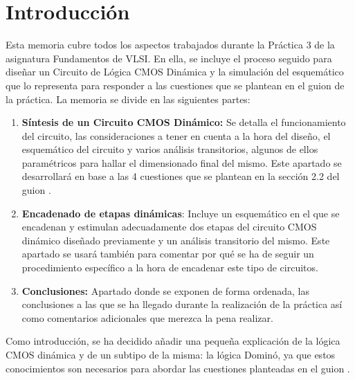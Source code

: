 
\renewcommand{\chaptername}{Sección}
\chapter{Introducción}

Esta memoria cubre todos los aspectos trabajados durante la Práctica 3 \cite{Guion} de la asignatura Fundamentos de VLSI. En ella, se incluye el proceso seguido para diseñar un Circuito de Lógica CMOS \cite{MOSFET} Dinámica y la simulación del esquemático que lo representa para responder a las cuestiones que se plantean en el guion de la práctica. La memoria se divide en las siguientes partes:

\begin{enumerate}
    \item \textbf{Síntesis de un Circuito CMOS Dinámico:} Se detalla el funcionamiento del circuito, las consideraciones a tener en cuenta a la hora del diseño, el esquemático del circuito y varios análisis transitorios, algunos de ellos paramétricos para hallar el dimensionado final del mismo. Este apartado se desarrollará en base a las 4 cuestiones que se plantean en la sección 2.2 del guion \cite{Guion}.
    \item \textbf{Encadenado de etapas dinámicas}: Incluye un esquemático en el que se encadenan y estimulan adecuadamente dos etapas del circuito CMOS dinámico diseñado previamente y un análisis transitorio del mismo. Este apartado se usará también para comentar por qué se ha de seguir un procedimiento específico a la hora de encadenar este tipo de circuitos.
    \item \textbf{Conclusiones:} Apartado donde se exponen de forma ordenada, las conclusiones a las que se ha llegado durante la realización de la práctica así como comentarios adicionales que merezca la pena realizar.
\end{enumerate}

Como introducción, se ha decidido añadir una pequeña explicación de la lógica CMOS dinámica y de un subtipo de la misma: la lógica Dominó, ya que estos conocimientos son necesarios para abordar las cuestiones planteadas en el guion \cite{Guion}.


